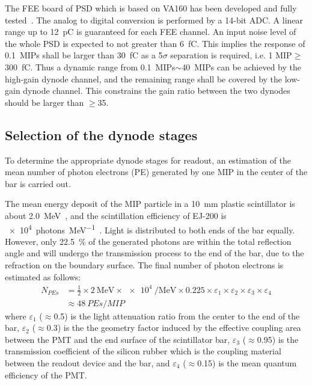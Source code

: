 \documentclass[preprint, times]{elsarticle}
\begin{document}
The FEE board of PSD which is based on VA160 has been developed and fully tested~\cite{fee}. The analog to digital conversion is performed by a 14-bit ADC. A linear range up to \SI{12}{\pico\coulomb} is guaranteed for each FEE channel. An input noise level of the whole PSD is expected to not greater than \SI{6}{\femto\coulomb}. This implies the response of \SI{0.1}{MIPs} shall be larger than \SI{30}{\femto\coulomb} as a 5$\sigma$ separation is required, i.e. 1 MIP$\geq$\SI{300}{\femto\coulomb}.
 Thus a dynamic range from \SI{0.1}{MIPs}$\sim$\SI{40}{MIPs} can be achieved by the high-gain dynode channel, and the remaining range shall be covered by the low-gain dynode channel.
This constrains the gain ratio between the two dynodes should be larger than $\geq$35.

\subsection{Selection of the dynode stages}
\label{sec:dynodes_selection}
To determine the appropriate dynode stages for readout, an estimation of the mean number of photon electrons (PE) generated by one MIP in the center of the bar is carried out.

The mean energy deposit of the MIP particle in a \SI{10}{\milli\meter} plastic scintillator is about \SI{2.0}{\mega\electronvolt}~\cite{olive_review_2014}, and the scintillation efficiency of EJ-200 is \SI[per-mode=symbol]{e4}{photons\per\mega\electronvolt}~\cite{scintillator}.
Light is distributed to both ends of the bar equally.
However, only \SI{22.5}{\percent} of the generated photons are within the total reflection angle and will undergo the transmission process to the end of the bar, due to the refraction on the boundary surface.
The final number of photon electrons is estimated as follows:
\begin{align}
 N_{PEs} &= \frac{1}{2} \times \SI[per-mode=symbol]{2}{\mega\electronvolt} \times \SI{e4}{\per\mega\electronvolt} \times 0.225
           \times \varepsilon_{1} \times \varepsilon_{2} \times \varepsilon_{3} \times \varepsilon_{4} \nonumber \\
         &\approx \SI{48}{PEs\per{MIP}}
\label{eq:pes}
\end{align}
where $\varepsilon_1$ ($\approx$0.5) is the light attenuation ratio from the center to the end of the bar,
$\varepsilon_2$ ($\approx$0.3) is the the geometry factor induced by the effective coupling area between the PMT and the end surface of the scintillator bar,
$\varepsilon_3$ ($\approx$0.95) is the transmission coefficient of the silicon rubber which is the coupling material between the readout device and the bar,
and $\varepsilon_4$ ($\approx$0.15) is the mean quantum efficiency of the PMT.
\end{document}
